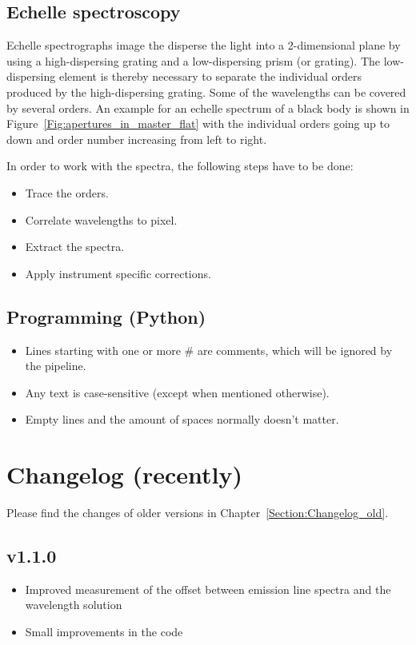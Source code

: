 \documentclass[10pt,a4paper]{article}
\begin{document}
\subsection{Echelle spectroscopy}
Echelle spectrographs image the disperse the light into a 2-dimensional plane by using a high-dispersing grating and a low-dispersing prism (or grating). The low-dispersing element is thereby necessary to separate the individual orders produced by the high-dispersing grating. Some of the wavelengths can be covered by several orders. An example for an echelle spectrum of a black body is shown in Figure~\ref{Fig:apertures_in_master_flat} with the individual orders going up to down and order number increasing from left to right.

In order to work with the spectra, the following steps have to be done:
\begin{itemize}
  \item Trace the orders.
  \item Correlate wavelengths to pixel.
  \item Extract the spectra.
  \item Apply instrument specific corrections.
\end{itemize}

\subsection{Programming (Python)}

\begin{itemize}
  \item Lines starting with one or more \# are comments, which will be ignored  by the pipeline.
  \item Any text is case-sensitive (except when mentioned otherwise).
  \item Empty lines and the amount of spaces normally doesn't matter.
\end{itemize}


\newpage

\section{Changelog (recently)}
\label{Section:Changelog_new}
Please find the changes of older versions in Chapter~\ref{Section:Changelog_old}.

\subsection*{v1.1.0}
\begin{itemize}\setlength\itemsep{0em}
  \item Improved measurement of the offset between emission line spectra and the wavelength solution
  \item Small improvements in the code
\end{itemize}
\end{document}
